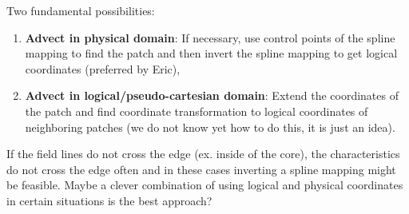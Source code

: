 \documentclass[presentation.tex]{subfiles}
\begin{document}
Two fundamental possibilities:
\begin{enumerate}
	\item \textbf{Advect in physical domain}: If necessary, use control points of the spline mapping
			to find the patch and then invert the spline mapping to get logical coordinates
			(preferred by Eric),
	\item \textbf{Advect in logical/pseudo-cartesian domain}: Extend the coordinates of the patch
			and find coordinate transformation to logical coordinates of neighboring patches (we do not know yet how to do this, it is just an idea).
\end{enumerate}

If the field lines do not cross the edge (ex. inside of the core), the characteristics do not cross the edge often and 
in these cases inverting a spline mapping might be feasible. Maybe a clever combination of using logical and 
physical coordinates in certain situations is the best approach?
\end{document}
